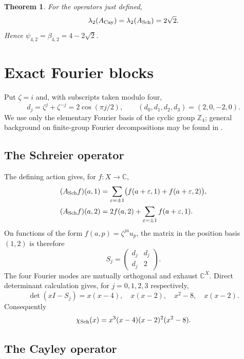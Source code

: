 \documentclass[11pt]{article}
\newtheorem{theorem}{Theorem}
\newcommand{\Z}{\mathbb Z}
\newcommand{\C}{\mathbb C}
\begin{document}
\begin{theorem}\label{thm:main}
For the operators just defined,
\[
 \lambda_2(A_{\rm Cay})=\lambda_2(A_{\rm Sch})=2\sqrt2.
\]
Hence $\psi_{4,2}=\beta_{4,2}=4-2\sqrt2$.
\end{theorem}

\section{Exact Fourier blocks}

Put $\zeta=i$ and, with subscripts taken modulo four,
\[
 d_j=\zeta^j+\zeta^{-j}=2\cos(\pi j/2),\qquad
 (d_0,d_1,d_2,d_3)=(2,0,-2,0).
\]
We use only the elementary Fourier basis of the cyclic group $\Z_4$; general
background on finite-group Fourier decompositions may be found in
\cite{Terras1999}.

\subsection{The Schreier operator}

The defining action gives, for $f:X\to\C$,
\begin{align*}
 (A_{\rm Sch}f)(a,1)
   &=\sum_{\varepsilon=\pm1}
        \bigl(f(a+\varepsilon,1)+f(a+\varepsilon,2)\bigr),\\
 (A_{\rm Sch}f)(a,2)
   &=2f(a,2)+\sum_{\varepsilon=\pm1}f(a+\varepsilon,1).
\end{align*}
On functions of the form $f(a,p)=\zeta^{ja}u_p$, the matrix in the position
basis $(1,2)$ is therefore
\[
 S_j=\begin{pmatrix}d_j&d_j\\d_j&2\end{pmatrix}.
\]
The four Fourier modes are mutually orthogonal and exhaust $\C^X$.  Direct
determinant calculation gives, for $j=0,1,2,3$ respectively,
\[
 \det(xI-S_j)=x(x-4),\quad x(x-2),\quad x^2-8,\quad x(x-2).
\]
Consequently
\begin{equation}\label{eq:sch-char}
 \chi_{\rm Sch}(x)=x^3(x-4)(x-2)^2(x^2-8).
\end{equation}

\subsection{The Cayley operator}
\end{document}
